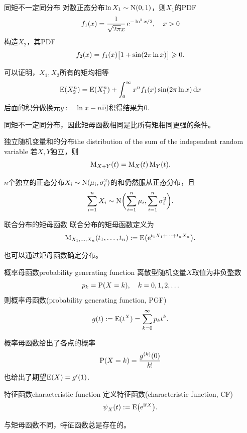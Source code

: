 \begin{example}{同矩不一定同分布}{}
	对数正态分布$\ln X_1 \sim \NormalDist(0,1)$，则$X_1$的PDF
	\[
		f_1(x) = \frac1{\sqrt{2\pi}x}\e^{-\ln^2x/2},\quad x > 0
	\]
	构造$X_2$，其PDF
	\[
		f_2(x) = f_1(x)\bigb{1 + \sin(2\pi\ln x)} \geqslant 0.
	\]

	可以证明，$X_1,X_2$所有的矩均相等
	\[
		\E(X_2^n) = \E(X_1^n) + \intRplus x^nf_1(x)\sin(2\pi\ln x)\d x
	\]
	后面的积分做换元$y := \ln x - n$可积得结果为0.
\end{example}
\begin{corollary}
	同矩不一定同分布，因此矩母函数相同是比所有矩相同更强的条件。
\end{corollary}
\begin{theorem}{独立随机变量和的分布}{the distribution of the sum of the independent random variable}
	若$X,Y$独立，则
	\begin{equation}\label{eq:ps-mgf-independent-sum}
		\MGF_{X+Y}(t) = \MGF_X(t)\MGF_Y(t).
	\end{equation}
\end{theorem}
\begin{corollary}
	$n$个独立的正态分布$X_i \sim \NormalDist(\mu_i,\sigma_i^2)$的和仍然服从正态分布，且
	\begin{equation}\label{eq:ps-normal-sum}
		\sum_{i=1}^nX_i \sim \NormalDist\biggp{\sum_{i=1}^n\mu_i,\sum_{i=1}^n\sigma_i^2}.
	\end{equation}
\end{corollary}
\begin{definition}{联合分布的矩母函数}{}
	联合分布的矩母函数定义为
	\begin{equation}
		\MGF_{X_1,\ldots,X_n}(t_1,\ldots,t_n) := \E\bigp{\e^{t_1X_1+\cdots+t_nX_n}}.
	\end{equation}
\end{definition}
也可以通过矩母函数确定分布。
\begin{definition}{概率母函数}{probability generating function}
	离散型随机变量$X$取值为非负整数
	\[
		p_k = \P(X = k),\quad k = 0,1,2,\ldots
	\]
	则概率母函数(probability generating function, PGF)
	\begin{equation}\label{eq:ps-pgf}
		g(t) := \E(t^X) = \sum_{k=0}^\infty p_kt^k.
	\end{equation}
\end{definition}
概率母函数给出了各点的概率
\begin{equation}\label{eq:ps-pgf-mass}
	\P(X = k) = \frac{g^{(k)}(0)}{k!}
\end{equation}
也给出了期望$\E(X) = g'(1)$.
\begin{definition}{特征函数}{characteristic function}
	定义特征函数(characteristic function, CF)
	\begin{equation}\label{CF-def}
		\CF_X(t) := \E\bigp{\e^{\i tX}}.
	\end{equation}
\end{definition}
与矩母函数不同，特征函数总是存在的。
